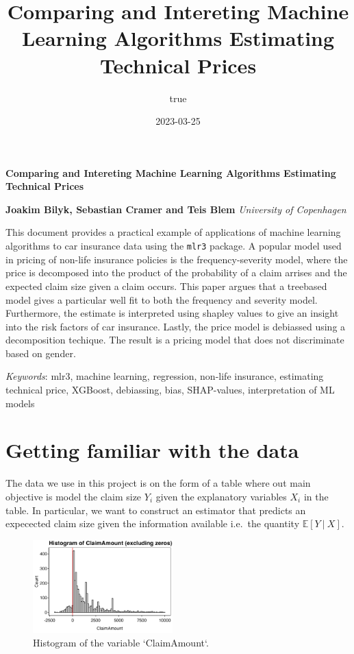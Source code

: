\documentclass[
]{article}
\title{Comparing and Intereting Machine Learning Algorithms Estimating
Technical Prices}
\author{true}
\date{2023-03-25}
\begin{document}
\Large\textbf{Comparing and Intereting Machine Learning Algorithms
Estimating Technical Prices}
\normalsize

\noindent \textbf{ Joakim Bilyk, Sebastian Cramer and Teis
Blem} \hfill  \emph{\small University of Copenhagen}   


\hbox{\vrule height .2pt width 39.14pc}

\noindent This document provides a practical example of applications of
machine learning algorithms to car insurance data using the
\texttt{mlr3} package. A popular model used in pricing of non-life
insurance policies is the frequency-severity model, where the price is
decomposed into the product of the probability of a claim arrises and
the expected claim size given a claim occurs. This paper argues that a
treebased model gives a particular well fit to both the frequency and
severity model. Furthermore, the estimate is interpreted using shapley
values to give an insight into the risk factors of car insurance.
Lastly, the price model is debiassed using a decomposition techique. The
result is a pricing model that does not discriminate based on gender.


\noindent \emph{Keywords}: mlr3, machine learning, regression, non-life
insurance, estimating technical price, XGBoost, debiassing, bias,
SHAP-values, interpretation of ML models \par

 \hbox{\vrule height .2pt width 39.14pc}




{
\hypersetup{linkcolor=black}
\setcounter{tocdepth}{2}
\tableofcontents
}
\newpage

\hypertarget{getting-familiar-with-the-data}{%
\section{Getting familiar with the
data}\label{getting-familiar-with-the-data}}

The data we use in this project is on the form of a table where out main
objective is model the claim size \(Y_i\) given the explanatory
variables \(X_i\) in the table. In particular, we want to construct an
estimator that predicts an expecected claim size given the information
available i.e.~the quantity \(\mathbb E[Y\ \vert\ X]\).

\begin{figure}
  \begin{center}
    \includegraphics[width=0.48\textwidth]{figures/plot1.png}
  \end{center}
  \caption{Histogram of the variable `ClaimAmount`.}
\end{figure}
\end{document}
